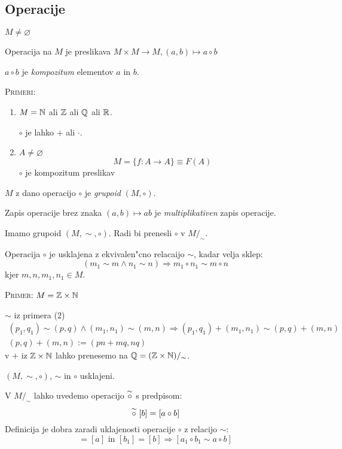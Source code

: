 \subsection{Operacije}
$M \neq \varnothing$

Operacija na $M$ je preslikava $M \times M \rightarrow M, (a, b) \mapsto a \circ b$

$a \circ b$ je \emph{kompozitum} elementov $a$ in $b$.

\textsc{Primeri:}
\begin{enumerate}[1)]
	\item $M = \mathbb{N}$ ali $\mathbb{Z}$ ali $\mathbb{Q}$ ali $\mathbb{R}$.
	
	$\circ$ je lahko $+$ ali $\cdot$.
	\item $A \neq \varnothing$
	\begin{equation*}
	M = \{f: A \rightarrow A\} \equiv F(A)
	\end{equation*}
	$\circ$ je kompozitum preslikav
\end{enumerate}

$M$ z dano operacijo $\circ$ je \emph{grupoid} $(M, \circ)$.

Zapis operacije brez znaka $(a, b) \mapsto ab$ je \emph{multiplikativen} zapis operacije.

Imamo grupoid $(M, \sim, \circ)$. Radi bi prenesli $\circ$ v $M/_\sim$.

Operacija $\circ$ je usklajena z ekvivalen"cno relacaijo $\sim$, kadar velja sklep:
\begin{equation*}
(m_1 \sim m \land n_1 \sim n) \Rightarrow m_1 \circ n_1 \sim m \circ n
\end{equation*}
kjer $m, n, m_1, n_1 \in M$.

\textsc{Primer:} $M = \mathbb{Z} \times \mathbb{N}$

$\sim$ iz primera (2)
\begin{gather*}
(p_1, q_1) \sim (p, q) \land (m_1, n_1) \sim (m, n) \Rightarrow (p_1, q_1) + (m_1, n_1) \sim (p, q) + (m, n)\\
(p,q) + (m, n) := (pn + mq, nq)
\end{gather*}v
$+$ iz $\mathbb{Z} \times \mathbb{N}$ lahko prenesemo na $\mathbb{Q} = (\mathbb{Z} \times \mathbb{N})/_\sim$.

$(M, \sim, \circ)$, $\sim$ in $\circ$ usklajeni.

V $M/_\sim$ lahko uvedemo operacijo $\stackrel{\sim}{\circ}$ s predpisom:
\begin{equation*}
[a] \scric [b] = [a \circ b]
\end{equation*}
Definicija je dobra zaradi uklajenosti operacije $\circ$ z relacijo $\sim$:
\begin{equation*}
[a_1] = [a] \text{ in } [b_1] = [b] \Rightarrow [a_1 \circ b_1 \sim a \circ b]
\end{equation*}

